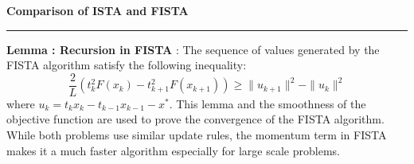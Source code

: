 \documentclass[a4paper,12pt]{article}
\newenvironment{solution}[2][]{%
    \begin{mdframed}[linecolor=blue!70!black, linewidth=2pt, roundcorner=10pt, backgroundcolor=yellow!10!white, skipabove=12pt, skipbelow=12pt]%
        \textbf{\large #2}
        \par\noindent\rule{\textwidth}{0.4pt}
}{
    \end{mdframed}
}
\begin{document}
\begin{solution}{Comparison of ISTA and FISTA}
  \noindent \textbf{Lemma : Recursion in FISTA} : The sequence of values generated by the FISTA algorithm satisfy the following inequality:
  \begin{equation}
    \frac{2}{L} \left( t_k^2 F(x_k) - t_{k+1}^2 F(x_{k+1}) \right) \geq \| u_{k+1} \|^2 - \| u_k \|^2
  \end{equation}
  \noindent where \( u_k = t_k x_k - t_{k-1} x_{k-1} - x^*\). This lemma and the smoothness of the objective function are used to prove the convergence of the FISTA algorithm. While both problems use similar update rules, the momentum term in FISTA makes it a much faster algorithm especially for large scale problems.
\end{solution}
\end{document}
